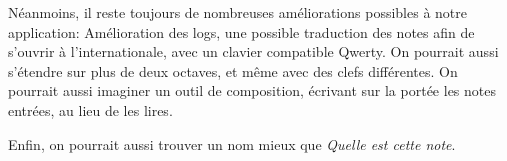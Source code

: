 \documentclass{article}
\begin{document}
Néanmoins, il reste toujours de nombreuses améliorations possibles à notre application: Amélioration des logs, une possible traduction des notes afin de s'ouvrir à l'internationale, avec un clavier compatible Qwerty. On pourrait aussi s'étendre sur plus de deux octaves, et même avec des clefs différentes. On pourrait aussi imaginer un outil de composition, écrivant sur la portée les notes entrées, au lieu de les lires. 

Enfin, on pourrait aussi trouver un nom mieux que \emph{Quelle est cette note}.
\end{document}
